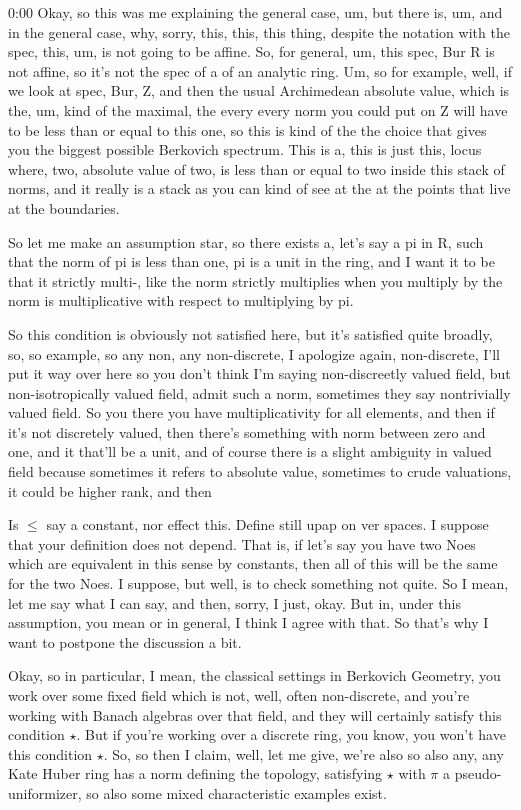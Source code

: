 \begin{unfinished}{0:00}
Okay, so this was me explaining the general case, um, but there is, um, and in the general case, why, sorry, this, this, this thing, despite the notation with the spec, this, um, is not going to be affine. So, for general, um, this spec, Bur R is not affine, so it's not the spec of a of an analytic ring. Um, so for example, well, if we look at spec, Bur, Z, and then the usual Archimedean absolute value, which is the, um, kind of the maximal, the every every norm you could put on Z will have to be less than or equal to this one, so this is kind of the the choice that gives you the biggest possible Berkovich spectrum. This is a, this is just this, locus where, two, absolute value of two, is less than or equal to two inside this stack of norms, and it really is a stack as you can kind of see at the at the points that live at the boundaries.

So let me make an assumption star, so there exists a, let's say a pi in R, such that the norm of pi is less than one, pi is a unit in the ring, and I want it to be that it strictly multi-, like the norm strictly multiplies when you multiply by the norm is multiplicative with respect to multiplying by pi.

So this condition is obviously not satisfied here, but it's satisfied quite broadly, so, so example, so any non, any non-discrete, I apologize again, non-discrete, I'll put it way over here so you don't think I'm saying non-discreetly valued field, but non-isotropically valued field, admit such a norm, sometimes they say nontrivially valued field. So you there you have multiplicativity for all elements, and then if it's not discretely valued, then there's something with norm between zero and one, and it that'll be a unit, and of course there is a slight ambiguity in valued field because sometimes it refers to absolute value, sometimes to crude valuations, it could be higher rank, and then

Is $\leq$ say a constant, nor effect this. Define still upap on ver spaces. I suppose that your definition does not depend. That is, if let's say you have two Noes which are equivalent in this sense by constants, then all of this will be the same for the two Noes. I suppose, but well, is to check something not quite. So I mean, let me say what I can say, and then, sorry, I just, okay. But in, under this assumption, you mean or in general, I think I agree with that. So that's why I want to postpone the discussion a bit. 

Okay, so in particular, I mean, the classical settings in Berkovich Geometry, you work over some fixed field which is not, well, often non-discrete, and you're working with Banach algebras over that field, and they will certainly satisfy this condition $\star$. But if you're working over a discrete ring, you know, you won't have this condition $\star$. So, so then I claim, well, let me give, we're also so also any, any Kate Huber ring has a norm defining the topology, satisfying $\star$ with $\pi$ a pseudo-uniformizer, so also some mixed characteristic examples exist.


\end{unfinished}
